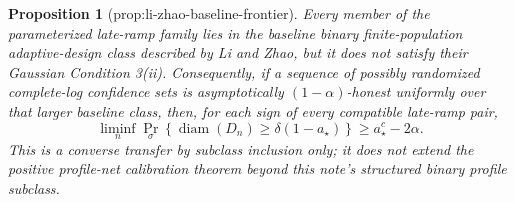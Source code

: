 \documentclass{article}
\newtheorem{proposition}{Proposition}
\begin{document}
\begin{proposition}[prop:li-zhao-baseline-frontier]\label{prop:li-zhao-baseline-frontier}
Every member of the parameterized late-ramp family lies in the baseline binary finite-population adaptive-design class described by Li and Zhao, but it does not satisfy their Gaussian Condition 3(ii). Consequently, if a sequence of possibly randomized complete-log confidence sets is asymptotically \((1-\alpha)\)-honest uniformly over that larger baseline class, then, for each sign of every compatible late-ramp pair,
\[
 \liminf_n\Pr_\sigma\!\left\{
 \operatorname{diam}(D_n)\ge\delta(1-a_\star)\right\}
 \ge a_\star^c-2\alpha.
\]
This is a converse transfer by subclass inclusion only; it does not extend the positive profile-net calibration theorem beyond this note's structured binary profile subclass.
\end{proposition}
\end{document}
